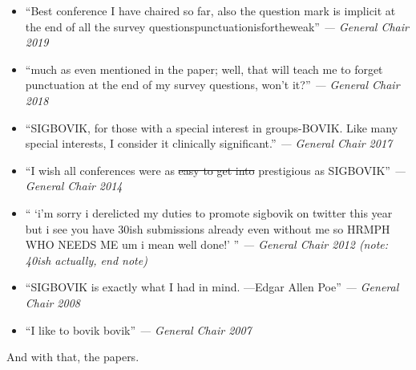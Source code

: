 \documentclass[12pt]{article}
\begin{document}
\begin{itemize}
\item ``Best conference I have chaired so far, also the question mark is implicit at the end of all the survey questionspunctuationisfortheweak'' \emph{--- General Chair 2019}

\item ``much as even mentioned in the paper; well, that will teach me to forget punctuation at the end of my survey questions, won't it?'' \emph{--- General Chair 2018}

\item ``SIGBOVIK, for those with a special interest in groups-BOVIK. Like many special interests, I consider it clinically significant.'' \emph{--- General Chair 2017}

\item ``I wish all conferences were as \sout{easy to get into} prestigious as SIGBOVIK'' \emph{--- General Chair 2014}

\item `` `i'm sorry i derelicted my duties to promote sigbovik on twitter this year but i see you have 30ish submissions already even without me so HRMPH WHO NEEDS ME um i mean well done!' '' \emph{--- General Chair 2012 (note: 40ish actually, end note)}

\item ``SIGBOVIK is exactly what I had in mind. ---Edgar Allen Poe'' \emph{--- General Chair 2008}

\item ``I like to bovik bovik'' \emph{--- General Chair 2007}

\end{itemize}

And with that, the papers.


\thispagestyle{empty}
\end{document}
